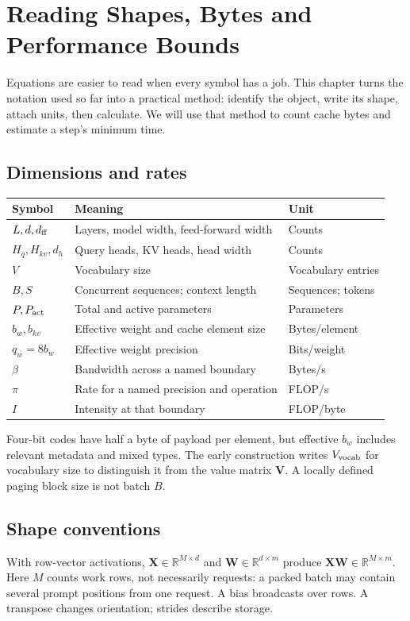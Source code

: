 \chapter{Reading Shapes, Bytes and Performance Bounds}\label{app:notation}
\begin{ChapterIntent}
Equations are easier to read when every symbol has a job. This chapter
turns the notation used so far into a practical method: identify the
object, write its shape, attach units, then calculate. We will use that
method to count cache bytes and estimate a step's minimum time.
\end{ChapterIntent}

\section{Dimensions and rates}
\begin{longtable}{@{}p{.19\linewidth}p{.48\linewidth}p{.24\linewidth}@{}}
\toprule Symbol & Meaning & Unit\\\midrule
$L,d,d_{\rm ff}$ & Layers, model width, feed-forward width & Counts\\
$H_q,H_{kv},d_h$ & Query heads, KV heads, head width & Counts\\
$V$ & Vocabulary size & Vocabulary entries\\
$B,S$ & Concurrent sequences; context length & Sequences; tokens\\
$P,P_{\rm act}$ & Total and active parameters & Parameters\\
$b_w,b_{kv}$ & Effective weight and cache element size & Bytes/element\\
$q_w=8b_w$ & Effective weight precision & Bits/weight\\
$\beta$ & Bandwidth across a named boundary & Bytes/s\\
$\pi$ & Rate for a named precision and operation & FLOP/s\\
$I$ & Intensity at that boundary & FLOP/byte\\
\bottomrule
\end{longtable}
Four-bit codes have half a byte of payload per element, but effective
$b_w$ includes relevant metadata and mixed types. The early construction writes
$V_{\rm vocab}$ for vocabulary size to distinguish it from the value
matrix $\mathbf{V}$. A locally defined paging block size is not batch $B$.

\section{Shape conventions}
With row-vector activations,
$\mathbf{X}\in\mathbb{R}^{M\times d}$ and
$\mathbf{W}\in\mathbb{R}^{d\times m}$ produce
$\mathbf{XW}\in\mathbb{R}^{M\times m}$. Here $M$ counts work rows, not
necessarily requests: a packed batch may contain several prompt positions
from one request. A bias broadcasts over rows. A transpose changes
orientation; strides describe storage.

